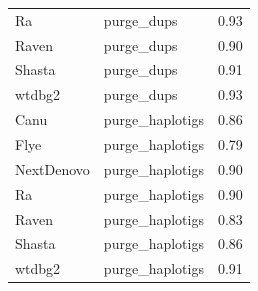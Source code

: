 \begin{suppsection}
\begin{table}[ht]
\begin{adjustbox}{totalheight=\baselineskip}
\begin{tabular}{llc}
Ra & purge\_dups & 0.93 \\
Raven & purge\_dups & 0.90 \\
Shasta & purge\_dups & 0.91 \\
wtdbg2 & purge\_dups & 0.93 \\
Canu & purge\_haplotigs & 0.86 \\
Flye & purge\_haplotigs & 0.79 \\
NextDenovo & purge\_haplotigs & 0.90 \\
Ra & purge\_haplotigs & 0.90 \\
Raven & purge\_haplotigs & 0.83 \\
Shasta & purge\_haplotigs & 0.86 \\
wtdbg2 & purge\_haplotigs & 0.91 \\
\hline
\end{tabular}
\end{adjustbox}
\label{tab:nanopore_happy_part1}
\end{table}


\end{suppsection}
